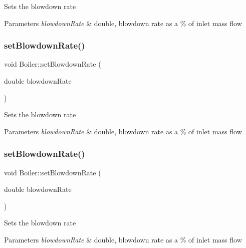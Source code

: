 Sets the blowdown rate 
\begin{DoxyParams}{Parameters}
{\em blowdown\+Rate} & double, blowdown rate as a \% of inlet mass flow \\
\hline
\end{DoxyParams}
\mbox{\label{class_boiler_a66c0e4c577dbd3f52dcf202e69a08371}} 
\subsubsection{\texorpdfstring{set\+Blowdown\+Rate()}{setBlowdownRate()}\hspace{0.1cm}{\footnotesize\ttfamily [2/3]}}
{\footnotesize\ttfamily void Boiler\+::set\+Blowdown\+Rate (\begin{DoxyParamCaption}\item[{double}]{blowdown\+Rate }\end{DoxyParamCaption})}

Sets the blowdown rate 
\begin{DoxyParams}{Parameters}
{\em blowdown\+Rate} & double, blowdown rate as a \% of inlet mass flow \\
\hline
\end{DoxyParams}
\mbox{\label{class_boiler_a66c0e4c577dbd3f52dcf202e69a08371}} 
\subsubsection{\texorpdfstring{set\+Blowdown\+Rate()}{setBlowdownRate()}\hspace{0.1cm}{\footnotesize\ttfamily [3/3]}}
{\footnotesize\ttfamily void Boiler\+::set\+Blowdown\+Rate (\begin{DoxyParamCaption}\item[{double}]{blowdown\+Rate }\end{DoxyParamCaption})}

Sets the blowdown rate 
\begin{DoxyParams}{Parameters}
{\em blowdown\+Rate} & double, blowdown rate as a \% of inlet mass flow \\
\hline
\end{DoxyParams}


